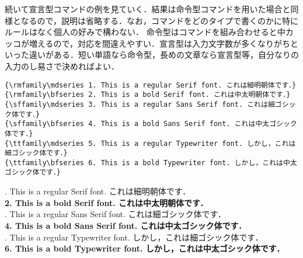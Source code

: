 続いて宣言型コマンドの例を見ていく．結果は命令型コマンドを用いた場合と同様となるので，説明は省略する．なお，コマンドをどのタイプで書くのかに特にルールはなく個人の好みで構わない．
命令型はコマンドを組み合わせると中カッコが増えるので，対応を間違えやすい．宣言型は入力文字数が多くなりがちといった違いがある．短い単語なら命令型，長めの文章なら宣言型等，自分なりの入力のし易さで決めればよい．
\begin{tcolorbox}[title=\gtbf{宣言型欧文コマンド使用例},colback=blue!5!white,colframe=blue!70!black,enhanced,breakable=true]
\begin{lstlisting}
{\rmfamily\mdseries 1. This is a regular Serif font. これは細明朝体です．}
{\rmfamily\bfseries 2. This is a bold Serif font. これは中太明朝体です．}
{\sffamily\mdseries 3. This is a regular Sans Serif font. これは細ゴシック体です．}
{\sffamily\bfseries 4. This is a bold Sans Serif font. これは中太ゴシック体です．}
{\ttfamily\mdseries 5. This is a regular Typewriter font. しかし，これは細ゴシック体です．}
{\ttfamily\bfseries 6. This is a bold Typewriter font. しかし，これは中太ゴシック体です．}
\end{lstlisting}
\begin{tcolorbox}[title=\gtbf{出力},colback=yellow!15!white,colframe=blue!75!black]
{\rmfamily{}. This is a regular Serif font. これは細明朝体です．}\\
{\rmfamily\bfseries 2. This is a bold Serif font. これは中太明朝体です．}\\
{\sffamily{}. This is a regular Sans Serif font. これは細ゴシック体です．}\\
{\sffamily\bfseries 4. This is a bold Sans Serif font. これは中太ゴシック体です．}\\
{\ttfamily{}. This is a regular Typewriter font. しかし，これは細{\color{red}ゴシック体}です．}\\
{\ttfamily\bfseries 6. This is a bold Typewriter font. しかし，これは中太{\color{red}ゴシック体}です．}
\end{tcolorbox}
\end{tcolorbox}

